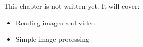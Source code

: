 \label{ch:py5}
\begin{keyidea}
This chapter is not written yet. It will cover:
\begin{itemize}[nosep]
  \item Reading images and video
  \item Simple image processing
\end{itemize}
\end{keyidea}
